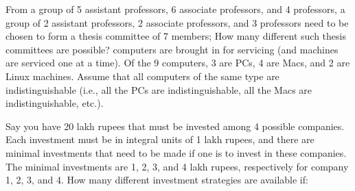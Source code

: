 \documentclass[12pt,addpoints,answers]{exam}
\begin{document}
\bracketedpoints
\pagestyle{headandfoot}
\mylogo
\begin{questions}
\question From a group of 5 assistant professors, 6 associate professors, and 4 professors, a group of 2 assistant professors, 2 associate professors, and 3 professors need to be chosen to form a thesis committee of 7 members;  How many different such thesis committees are possible?
 computers are brought in for servicing (and machines are serviced one at a time). Of the 9 computers, 3 are PCs, 4 are Macs, and 2 are Linux machines. Assume that all computers of the same type are indistinguishable (i.e., all the PCs are indistinguishable, all the Macs are indistinguishable, etc.).
\question Say you have 20 lakh rupees that must be invested among 4 possible companies. Each investment must be in integral units of
1 lakh rupees, and there are minimal investments that need to be made if one is to invest in these companies. The minimal investments are 1, 2, 3, and 4 lakh rupees, respectively for company 1, 2, 3, and 4. How many different investment strategies are available if:
\end{questions}
\end{document}
